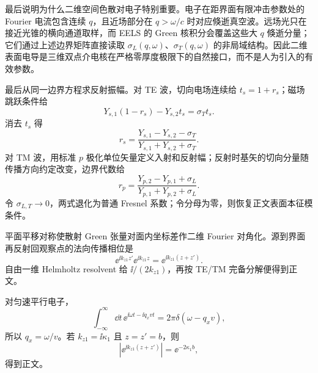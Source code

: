 \begin{derivation}[各向异性导电薄层的模式极点]
最后说明为什么二维空间色散对电子特别重要。电子在距界面有限冲击参数处的 Fourier 电流包含连续 $q$，且近场部分在
$q>\omega/c$ 时对应倏逝真空波。远场光只在接近光锥的横向通道取样，而 EELS 的 Green 核积分会覆盖这些大 $q$ 倏逝分量；它们通过上述边界矩阵直接读取 $\sigma_L(q,\omega)$、$\sigma_T(q,\omega)$ 的非局域结构。因此二维表面电导是三维双点介电核在严格零厚度极限下的自然接口，而不是人为引入的有效参数。

最后从同一边界方程求反射振幅。对 TE 波，切向电场连续给 $t_s=1+r_s$；磁场跳跃条件给
\[
Y_{s,1}(1-r_s)-Y_{s,2}t_s=\sigma_Tt_s.
\]
消去 $t_s$ 得
\[
r_s=\frac{Y_{s,1}-Y_{s,2}-\sigma_T}{Y_{s,1}+Y_{s,2}+\sigma_T}.
\]
对 TM 波，用标准 $p$ 极化单位矢量定义入射和反射幅；反射时基矢的切向分量随传播方向约定改变，边界代数给
\[
r_p=\frac{Y_{p,2}-Y_{p,1}+\sigma_L}{Y_{p,1}+Y_{p,2}+\sigma_L}.
\]
令 $\sigma_{L,T}\to0$，两式退化为普通 Fresnel 系数；令分母为零，则恢复正文表面本征模条件。

平面平移对称使散射 Green 张量对面内坐标差作二维 Fourier 对角化。源到界面再反射回观察点的法向传播相位是
\[
\ee^{\ii k_{z1}z'}\ee^{\ii k_{z1}z}=\ee^{\ii k_{z1}(z+z')}.
\]
自由一维 Helmholtz resolvent 给 $\ii/(2k_{z1})$，再按 TE/TM 完备分解便得到正文。

对匀速平行电子，
\[
\int_{-\infty}^{\infty}\dd t\,\ee^{\ii\omega t-\ii q_xvt}
=2\pi\delta(\omega-q_xv),
\]
所以 $q_x=\omega/v$。若 $k_{z1}=\ii\kappa_1$ 且 $z=z'=b$，则
\[
\left|\ee^{\ii k_{z1}(z+z')}\right|=\ee^{-2\kappa_1b},
\]
得到正文。
\end{derivation}



